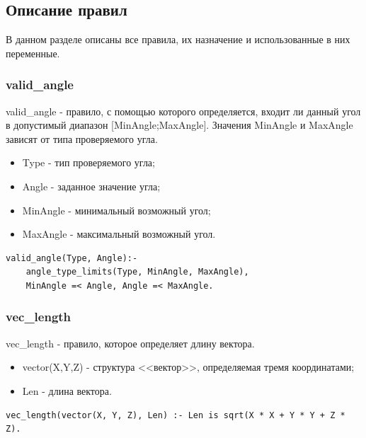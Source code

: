 \newpage

\subsection{Описание правил}
\hspace{0.6cm} В данном разделе описаны все правила, их назначение и использованные в них переменные.

\subsubsection{valid\_angle}
\hspace{0.6cm} valid\_angle - правило, с помощью которого определяется, входит ли данный угол в допустимый диапазон [MinAngle;MaxAngle]. Значения MinAngle и MaxAngle зависят от типа проверяемого угла.

\begin{itemize}
	\item Type - тип проверяемого угла;
	\item Angle - заданное значение угла;
	\item MinAngle - минимальный возможный угол;
	\item MaxAngle - максимальный возможный угол.
\end{itemize}

\begin{lstlisting}[caption=Реализация правила valid\_angle, label=rules:validangle]
valid_angle(Type, Angle):-
	angle_type_limits(Type, MinAngle, MaxAngle),
	MinAngle =< Angle, Angle =< MaxAngle.
\end{lstlisting}


\subsubsection{vec\_length}
\hspace{0.6cm} vec\_length - правило, которое определяет длину вектора.

\begin{itemize}
	\item vector(X,Y,Z) - структура <<вектор>>, определяемая тремя координатами;
	\item Len - длина вектора.
\end{itemize}

\begin{lstlisting}[caption=Реализация правила vec\_length, label=rules:veclength]
vec_length(vector(X, Y, Z), Len) :- Len is sqrt(X * X + Y * Y + Z * Z).
\end{lstlisting}

